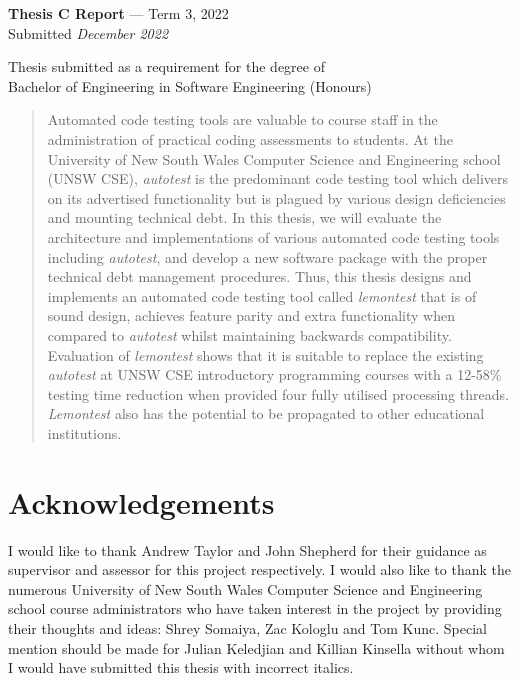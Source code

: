 \documentclass[hidelinks]{report}
\newcommand{\unchapter}[2]{
    \setcounter{chapter}{#1}
    \setcounter{section}{0}
    \chapter*{#2}
    \addcontentsline{toc}{chapter}{#2}
}
\begin{document}
\begin{titlepage}
\begin{center}
    \textbf{Thesis C Report} --- Term 3, 2022\\
    Submitted \textit{December 2022}
    
    \vspace{0.1cm}
    
    Thesis submitted as a requirement for the degree of\\
    Bachelor of Engineering in Software Engineering (Honours)
\end{center}

\vspace*{\fill}

\end{titlepage}

\begin{abstract}
Automated code testing tools are valuable to course staff in the administration of practical coding assessments to students. At the University of New South Wales Computer Science and Engineering school (UNSW CSE), \textit{autotest} is the predominant code testing tool which delivers on its advertised functionality but is plagued by various design deficiencies and mounting technical debt. In this thesis, we will evaluate the architecture and implementations of various automated code testing tools including \textit{autotest}, and develop a new software package with the proper technical debt management procedures. Thus, this thesis designs and implements an automated code testing tool called \textit{lemontest} that is of sound design, achieves feature parity and extra functionality when compared to \textit{autotest} whilst maintaining backwards compatibility. Evaluation of \textit{lemontest} shows that it is suitable to replace the existing \textit{autotest} at UNSW CSE introductory programming courses with a 12-58\% testing time reduction when provided four fully utilised processing threads. \textit{Lemontest} also has the potential to be propagated to other educational institutions.
\end{abstract}

\unchapter{0}{Acknowledgements}

I would like to thank Andrew Taylor and John Shepherd for their guidance as supervisor and assessor for this project respectively. I would also like to thank the numerous University of New South Wales Computer Science and Engineering school course administrators who have taken interest in the project by providing their thoughts and ideas: Shrey Somaiya, Zac Kologlu and Tom Kunc. Special mention should be made for Julian Keledjian and Killian Kinsella without whom I would have submitted this thesis with incorrect italics.
\end{document}
